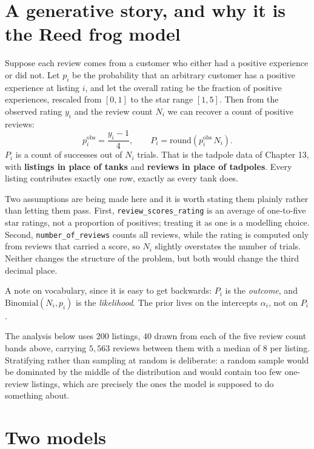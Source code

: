 \documentclass[11pt,a4paper]{article}
\begin{document}
\section{A generative story, and why it is the Reed frog model}

Suppose each review comes from a customer who either had a positive experience
or did not. Let $p_i$ be the probability that an arbitrary customer has a
positive experience at listing $i$, and let the overall rating be the fraction
of positive experiences, rescaled from $[0,1]$ to the star range $[1,5]$. Then
from the observed rating $y_i$ and the review count $N_i$ we can recover a
count of positive reviews:
\[
  p^{\text{obs}}_i = \frac{y_i - 1}{4},
  \qquad
  P_i = \text{round}\!\left(p^{\text{obs}}_i \, N_i\right).
\]
$P_i$ is a count of successes out of $N_i$ trials. That is the tadpole data of
Chapter 13, with \textbf{listings in place of tanks} and \textbf{reviews in
place of tadpoles}. Every listing contributes exactly one row, exactly as every
tank does.

Two assumptions are being made here and it is worth stating them plainly rather
than letting them pass. First, \texttt{review\_scores\_rating} is an average of
one-to-five star ratings, not a proportion of positives; treating it as one is
a modelling choice. Second, \texttt{number\_of\_reviews} counts all reviews,
while the rating is computed only from reviews that carried a score, so $N_i$
slightly overstates the number of trials. Neither changes the structure of the
problem, but both would change the third decimal place.

A note on vocabulary, since it is easy to get backwards: $P_i$ is the
\emph{outcome}, and $\text{Binomial}(N_i, p_i)$ is the \emph{likelihood}. The
prior lives on the intercepts $\alpha_i$, not on $P_i$.

The analysis below uses $200$ listings, $40$ drawn from each of the five review
count bands above, carrying $5{,}563$ reviews between them with a median of $8$
per listing. Stratifying rather than sampling at random is deliberate: a random
sample would be dominated by the middle of the distribution and would contain
too few one-review listings, which are precisely the ones the model is supposed
to do something about.

\section{Two models}
\end{document}
